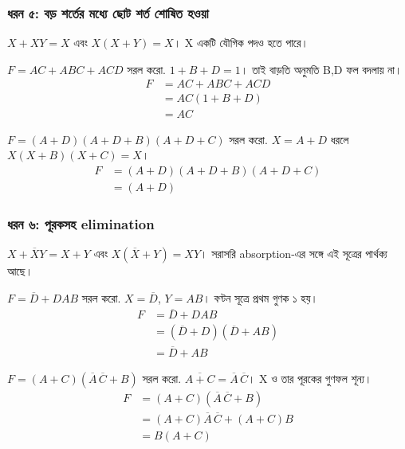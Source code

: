 \subsubsection*{ধরন ৫: বড় শর্তের মধ্যে ছোট শর্ত শোষিত হওয়া}
$X+XY=X$ এবং $X(X+Y)=X$। X একটি যৌগিক পদও হতে পারে।
\par\smallskip\noindent\begin{minipage}{\linewidth}
$F=AC+ABC+ACD$ সরল করো.
\chThreeAnswer $1+B+D=1$। তাই বাড়তি অনুমতি B,D ফল বদলায় না।
\[\begin{aligned}F&=AC+ABC+ACD\\
&=AC(1+B+D)\\
&=AC\end{aligned}\]

\end{minipage}\par\smallskip
\par\smallskip\noindent\begin{minipage}{\linewidth}
$F=(A+D)(A+D+B)(A+D+C)$ সরল করো.
\chThreeAnswer $X=A+D$ ধরলে $X(X+B)(X+C)=X$।
\[\begin{aligned}F&=(A+D)(A+D+B)(A+D+C)\\
&=(A+D)\end{aligned}\]

\end{minipage}\par\smallskip
{}
\subsubsection*{ধরন ৬: পূরকসহ elimination}
$X+\overline XY=X+Y$ এবং $X(\overline X+Y)=XY$। সরাসরি absorption-এর সঙ্গে এই সূত্রের পার্থক্য আছে।
\par\smallskip\noindent\begin{minipage}{\linewidth}
$F=\overline D+DAB$ সরল করো.
\chThreeAnswer $X=\overline D$, $Y=AB$। বণ্টন সূত্রে প্রথম গুণক ১ হয়।
\[\begin{aligned}F&=\overline D+DAB\\
&=(\overline D+D)(\overline D+AB)\\
&=\overline D+AB\end{aligned}\]

\end{minipage}\par\smallskip
\par\smallskip\noindent\begin{minipage}{\linewidth}
$F=(A+C)(\overline A\,\overline C+B)$ সরল করো.
\chThreeAnswer $\overline{A+C}=\overline A\,\overline C$। X ও তার পূরকের গুণফল শূন্য।
\[\begin{aligned}F&=(A+C)(\overline A\,\overline C+B)\\
&=(A+C)\overline A\,\overline C+(A+C)B\\
&=B(A+C)\end{aligned}\]

\end{minipage}\par\smallskip
{}
